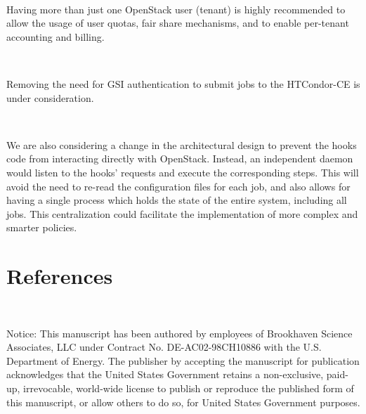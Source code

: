 \documentclass[a4paper]{jpconf}
\begin{document}
~

Having more than just one OpenStack user (tenant) is highly recommended to allow
the usage of user quotas, fair share mechanisms, and to enable per-tenant
accounting and billing.

~

Removing the need for GSI authentication to submit jobs to the HTCondor-CE is under consideration.

~

We are also considering a change in the architectural design to prevent the
hooks code from interacting directly with OpenStack. Instead, an independent
daemon would listen to the hooks' requests and execute the corresponding steps.
This will avoid the need to re-read the configuration files for each job, 
and also allows for having a single process which holds the state of the entire
system, including all jobs. This centralization could facilitate the
implementation of more complex and smarter policies.
 




\section*{References}{}




~

Notice:
This manuscript has been authored by employees of Brookhaven Science Associates,
LLC under Contract No. DE-AC02-98CH10886 with the U.S. Department of Energy.
The publisher by accepting the manuscript for publication acknowledges
that the United States Government retains a non-exclusive, paid-up, irrevocable,
world-wide license to publish or reproduce the published form of this manuscript,
or allow others to do so, for United States Government purposes.
\end{document}
